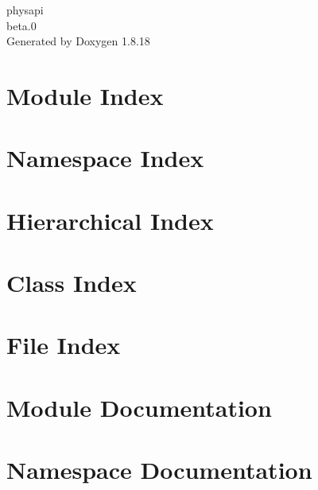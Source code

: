 \let\mypdfximage\pdfximage\def\pdfximage{\immediate\mypdfximage}\documentclass[twoside]{book}
\newcommand{\+}{\discretionary{\mbox{\scriptsize$\hookleftarrow$}}{}{}}
\newcommand{\clearemptydoublepage}{%
  \newpage{\pagestyle{empty}\cleardoublepage}%
}
\begin{document}
\hypersetup{pageanchor=false,
             bookmarksnumbered=true,
             pdfencoding=unicode
            }
\begin{titlepage}
\vspace*{7cm}
\begin{center}%
{\Large physapi \\[1ex]\large beta.\+0 }\\
\vspace*{1cm}
{\large Generated by Doxygen 1.8.18}\\
\end{center}
\end{titlepage}
\clearemptydoublepage
{}
\tableofcontents
\clearemptydoublepage
{}
\hypersetup{pageanchor=true}

\chapter{Module Index}

\chapter{Namespace Index}

\chapter{Hierarchical Index}

\chapter{Class Index}

\chapter{File Index}

\chapter{Module Documentation}










\chapter{Namespace Documentation}



\end{document}
